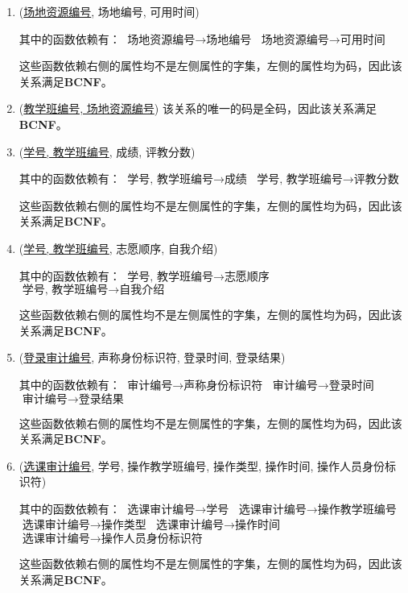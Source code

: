 \begin{enumerate}
    \item (\uline{场地资源编号}, 场地编号, 可用时间) \par
    其中的函数依赖有：
    $\text{场地资源编号} \rightarrow \text{场地编号}$
    $\text{场地资源编号} \rightarrow \text{可用时间}$ \par
    这些函数依赖右侧的属性均不是左侧属性的字集，左侧的属性均为码，因此该关系满足\textbf{BCNF}。
    
    \item (\uline{教学班编号, 场地资源编号})
    该关系的唯一的码是全码，因此该关系满足\textbf{BCNF}。
    
    \item (\uline{学号, 教学班编号}, 成绩, 评教分数) \par
    其中的函数依赖有：
    $\text{学号, 教学班编号} \rightarrow \text{成绩}$
    $\text{学号, 教学班编号} \rightarrow \text{评教分数}$ \par
    这些函数依赖右侧的属性均不是左侧属性的字集，左侧的属性均为码，因此该关系满足\textbf{BCNF}。
    
    \item (\uline{学号, 教学班编号}, 志愿顺序, 自我介绍) \par
    其中的函数依赖有：
    $\text{学号, 教学班编号} \rightarrow \text{志愿顺序}$
    $\text{学号, 教学班编号} \rightarrow \text{自我介绍}$ \par
    这些函数依赖右侧的属性均不是左侧属性的字集，左侧的属性均为码，因此该关系满足\textbf{BCNF}。
    
    \item (\uline{登录审计编号}, 声称身份标识符, 登录时间, 登录结果) \par
    其中的函数依赖有：
    $\text{审计编号} \rightarrow \text{声称身份标识符}$
    $\text{审计编号} \rightarrow \text{登录时间}$
    $\text{审计编号} \rightarrow \text{登录结果}$ \par
    这些函数依赖右侧的属性均不是左侧属性的字集，左侧的属性均为码，因此该关系满足\textbf{BCNF}。
    
    \item (\uline{选课审计编号}, 学号, 操作教学班编号, 操作类型, 操作时间, 操作人员身份标识符) \par
    其中的函数依赖有：
    $\text{选课审计编号} \rightarrow \text{学号}$
    $\text{选课审计编号} \rightarrow \text{操作教学班编号}$
    $\text{选课审计编号} \rightarrow \text{操作类型}$
    $\text{选课审计编号} \rightarrow \text{操作时间}$
    $\text{选课审计编号} \rightarrow \text{操作人员身份标识符}$ \par
    这些函数依赖右侧的属性均不是左侧属性的字集，左侧的属性均为码，因此该关系满足\textbf{BCNF}。
    
\end{enumerate}
